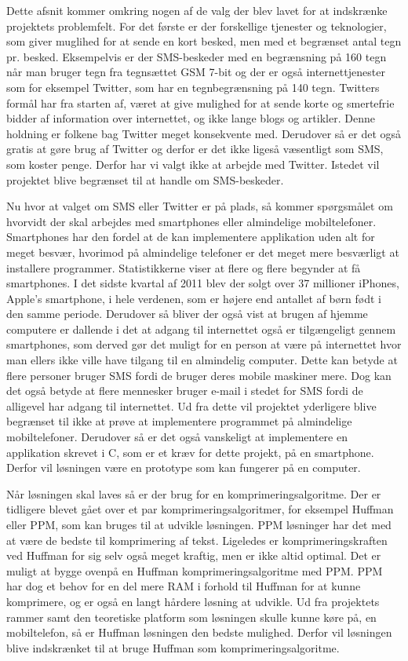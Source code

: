 Dette afsnit kommer omkring nogen af de valg der blev lavet for at indskrænke projektets problemfelt. For det første er der forskellige tjenester og teknologier, som giver muglihed for at sende en kort besked, men med et begrænset antal tegn pr. besked. Eksempelvis er der SMS-beskeder med en begrænsning på 160 tegn når man bruger tegn fra tegnsættet GSM 7-bit\cite{Pro_1} og der er også internettjenester som for eksempel Twitter, som har en tegnbegrænsning på 140 tegn\cite{pro_af1}. Twitters formål har fra starten af, været at give mulighed for at sende korte og smertefrie bidder af information over internettet, og ikke lange blogs og artikler. Denne holdning er folkene bag Twitter meget konsekvente med\cite{pro_af2}. Derudover så er det også gratis at gøre brug af Twitter og derfor er det ikke ligeså væsentligt som SMS, som koster penge. Derfor har vi valgt ikke at arbejde med Twitter. Istedet vil projektet blive begrænset til at handle om SMS-beskeder.

Nu hvor at valget om SMS eller Twitter er på plads, så kommer spørgsmålet om hvorvidt der skal arbejdes med smartphones eller almindelige mobiltelefoner. Smartphones har den fordel at de kan implementere applikation uden alt for meget besvær, hvorimod på almindelige telefoner er det meget mere besværligt at installere programmer. Statistikkerne viser at flere og flere begynder at få smartphones\cite{pro_af3}. I det sidste kvartal af 2011 blev der solgt over 37 millioner iPhones, Apple's smartphone, i hele verdenen, som er højere end antallet af børn født i den samme periode\cite{pro_af4}. Derudover så bliver der også vist at brugen af hjemme computere er dallende i det at adgang til internettet også er tilgængeligt gennem smartphones, som derved gør det muligt for en person at være på internettet hvor man ellers ikke ville have tilgang til en almindelig computer\cite{pro_af3}. Dette kan betyde at flere personer bruger SMS fordi de bruger deres mobile maskiner mere. Dog kan det også betyde at flere mennesker bruger e-mail i stedet for SMS fordi de alligevel har adgang til internettet. Ud fra dette vil projektet yderligere blive begrænset til ikke at prøve at implementere programmet på almindelige mobiltelefoner. Derudover så er det også vanskeligt at implementere en applikation skrevet i C, som er et kræv for dette projekt, på en smartphone. Derfor vil løsningen være en prototype som kan fungerer på en computer. 

Når løsningen skal laves så er der brug for en komprimeringsalgoritme. Der er tidligere blevet gået over et par komprimeringsalgoritmer, for eksempel Huffman eller PPM, som kan bruges til at udvikle løsningen. PPM løsninger har det med at være de bedste til komprimering af tekst. Ligeledes er komprimeringskraften ved Huffman for sig selv også meget kraftig, men er ikke altid optimal. Det er muligt at bygge ovenpå en Huffman komprimeringsalgoritme med PPM. PPM har dog et behov for en del mere RAM i forhold til Huffman for at kunne komprimere, og er også en langt hårdere løsning at udvikle. Ud fra projektets rammer samt den teoretiske platform som løsningen skulle kunne køre på, en mobiltelefon, så er Huffman løsningen den bedste mulighed. Derfor vil løsningen blive indskrænket til at bruge Huffman som komprimeringsalgoritme.\cite{pro_af5}

